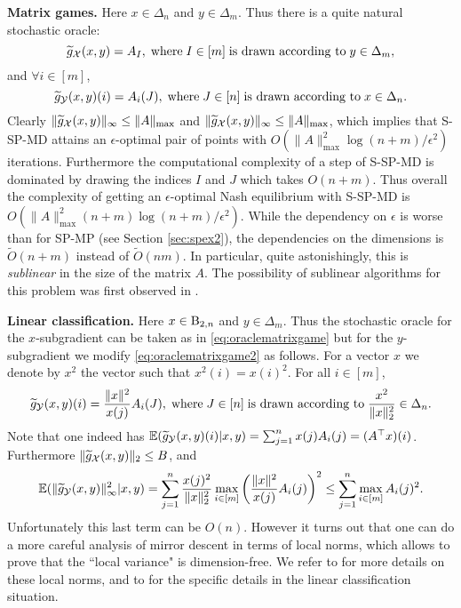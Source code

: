 \noindent
\textbf{Matrix games.} Here $x \in \Delta_n$ and $y \in \Delta_m$. Thus there is a quite natural stochastic oracle:
\begin{equation} \label{eq:oraclematrixgame}
\widetilde{g}_{\mathcal{X}}(x,y) = A_I, \; \text{where} \; I \in [m] \; \text{is drawn according to} \; y \in \Delta_m ,
\end{equation}
and $\forall i \in [m]$,
\begin{equation} \label{eq:oraclematrixgame2}
\widetilde{g}_{\mathcal{Y}}(x,y)(i) = A_i(J), \; \text{where} \; J \in [n] \; \text{is drawn according to} \; x \in \Delta_n .
\end{equation}
Clearly $\|\widetilde{g}_{\mathcal{X}}(x,y)\|_{\infty} \leq \|A\|_{\mathrm{max}}$ and $\|\widetilde{g}_{\mathcal{X}}(x,y)\|_{\infty} \leq \|A\|_{\mathrm{max}}$, which implies that S-SP-MD attains an $\epsilon$-optimal pair of points with $O\left(\|A\|_{\mathrm{max}}^2 \log(n+m) / \epsilon^2 \right)$ iterations. Furthermore the computational complexity of a step of S-SP-MD is dominated by drawing the indices $I$ and $J$ which takes $O(n + m)$. Thus overall the complexity of getting an $\epsilon$-optimal Nash equilibrium with S-SP-MD is $O\left(\|A\|_{\mathrm{max}}^2 (n + m) \log(n+m) / \epsilon^2  \right)$. While the dependency on $\epsilon$ is worse than for SP-MP (see Section \ref{sec:spex2}), the dependencies on the dimensions is $\tilde{O}(n+m)$ instead of $\tilde{O}(nm)$. In particular, quite astonishingly, this is {\em sublinear} in the size of the matrix $A$. The possibility of sublinear algorithms for this problem was first observed in \cite{GK95}.
\newline

\noindent
\textbf{Linear classification.} Here $x \in \mathrm{B}_{2,n}$ and $y \in \Delta_m$. Thus the stochastic oracle for the $x$-subgradient can be taken as in \eqref{eq:oraclematrixgame} but for the $y$-subgradient we modify \eqref{eq:oraclematrixgame2} as follows. For a vector $x$ we denote by $x^2$ the vector such that $x^2(i) = x(i)^2$. For all $i \in [m]$,
$$\widetilde{g}_{\mathcal{Y}}(x,y)(i) = \frac{\|x\|^2}{x(j)} A_i(J), \; \text{where} \; J \in [n] \; \text{is drawn according to} \; \frac{x^2}{\|x\|_2^2} \in \Delta_n .$$ 
Note that one indeed has $\mathbb{E} (\widetilde{g}_{\mathcal{Y}}(x,y)(i) | x,y) = \sum_{j=1}^n x(j) A_i(j) = (A^{\top} x)(i)$.
Furthermore $\|\widetilde{g}_{\mathcal{X}}(x,y)\|_2 \leq B$, and
$$\mathbb{E} (\|\widetilde{g}_{\mathcal{Y}}(x,y)\|_{\infty}^2 | x,y) = \sum_{j=1}^n \frac{x(j)^2}{\|x\|_2^2} \max_{i \in [m]} \left(\frac{\|x\|^2}{x(j)} A_i(j)\right)^2 \leq \sum_{j=1}^n \max_{i \in [m]} A_i(j)^2 .$$
Unfortunately this last term can be $O(n)$. However it turns out that one can do a more careful analysis of mirror descent in terms of local norms, which allows to prove that the ``local variance" is dimension-free. We refer to \cite{BC12} for more details on these local norms, and to \cite{CHW12} for the specific details in the linear classification situation.

